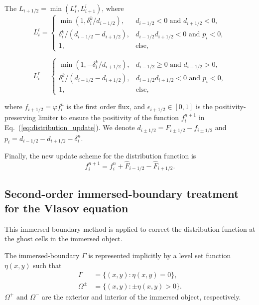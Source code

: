 The $L_{i+1/2} = \min(L_i^r, L_{i+1}^l)$, where
\begin{equation}
	L_i^l =
	\begin{cases}
		\min\left(1, \delta_i^k/d_{i-1/2} \right), & d_{i-1/2} < 0 \text{ and } d_{i+1/2} < 0,     \\
		\delta_i^k/(d_{i-1/2} - d_{i+1/2}),        & d_{i-1/2} d_{i+1/2} < 0 \text{ and } p_i < 0, \\
		1,                                         & \text{else},
	\end{cases}
	\label{eq:flux_limiter_left}
\end{equation}

\begin{equation}
	L_i^r =
	\begin{cases}
		\min\left(1, -\delta_i^k/d_{i+1/2} \right), & d_{i-1/2} \ge 0 \text{ and } d_{i+1/2} > 0,   \\
		\delta_i^k/(d_{i-1/2} - d_{i+1/2}),         & d_{i-1/2} d_{i+1/2} < 0 \text{ and } p_i < 0, \\
		1,                                          & \text{else},
	\end{cases}
	\label{eq:flux_limiter_right}
\end{equation}

where $f_{i+1/2} = \varphi f_i^n$ is the first order flux, and $\epsilon_{i+1/2}\in[0,1]$ is the positivity-preserving limiter to ensure the positivity of the function $f_{i}^{n+1}$ in Eq.~(\ref{eq:distribution_update}). We denote $d_{i\pm1/2} = F_{i\pm1/2} - f_{i\pm1/2}$ and $p_i = d_{i-1/2} - d_{i+1/2} -\delta_i^n$.

Finally, the new update scheme for the distribution function is
\begin{equation}
	f_i^{n+1} = f_i^n + \hat{F}_{i -1/2} - \hat{F}_{i+1/2}.
	\label{eq:final_update}
\end{equation}


\subsection{Second-order immersed-boundary treatment for the Vlasov equation}
This immersed boundary method is applied to correct the distribution function at the ghost cells in the immersed object.

The immersed-boundary $\Gamma$ is represented implicitly by a level set function $\eta(x,y)$ such that
\begin{align}
	\Gamma     & = \{ (x,y) : \eta(x,y) = 0 \},     \\
	\Omega^\pm & = \{ (x,y) : \pm \eta(x,y) > 0 \}.
\end{align}
$\Omega^+$ and $\Omega^-$ are the exterior and interior of the immersed object, respectively.

